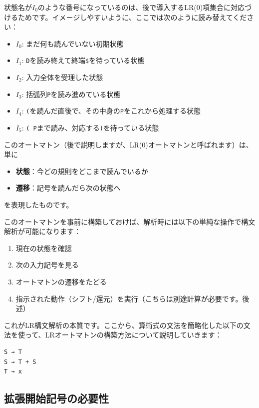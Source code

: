 状態名が\(I_0\)のような番号になっているのは、後で導入するLR(0)項集合に対応づけるためです。イメージしやすいように、ここでは次のように読み替えてください：

\begin{itemize}
\tightlist
\item
  \(I_0\): まだ何も読んでいない初期状態
\item
  \(I_1\): \texttt{D}を読み終えて終端\texttt{\$}を待っている状態
\item
  \(I_2\): 入力全体を受理した状態
\item
  \(I_3\): 括弧列\texttt{P}を読み進めている状態
\item
  \(I_4\):
  \texttt{(}を読んだ直後で、その中身の\texttt{P}をこれから処理する状態
\item
  \(I_5\): \texttt{(\ P}まで読み、対応する\texttt{)}を待っている状態
\end{itemize}

このオートマトン（後で説明しますが、LR(0)オートマトンと呼ばれます）は、単に

\begin{itemize}
\tightlist
\item
  \textbf{状態}：今どの規則をどこまで読んでいるか
\item
  \textbf{遷移}：記号を読んだら次の状態へ
\end{itemize}

を表現したものです。

このオートマトンを事前に構築しておけば、解析時には以下の単純な操作で構文解析が可能になります：

\begin{enumerate}
\def\labelenumi{\arabic{enumi}.}
\tightlist
\item
  現在の状態を確認
\item
  次の入力記号を見る
\item
  オートマトンの遷移をたどる
\item
  指示された動作（シフト/還元）を実行（こちらは別途計算が必要です。後述）
\end{enumerate}

これがLR構文解析の本質です。ここから、算術式の文法を簡略化した以下の文法を使って、LRオートマトンの構築方法について説明していきます：

\begin{verbatim}
S → T
S → T + S
T → x
\end{verbatim}

\hypertarget{chapter5-ux62e1ux5f35ux958bux59cbux8a18ux53f7ux306eux5fc5ux8981ux6027}{%
\subsection{拡張開始記号の必要性}\label{chapter5-ux62e1ux5f35ux958bux59cbux8a18ux53f7ux306eux5fc5ux8981ux6027}}

